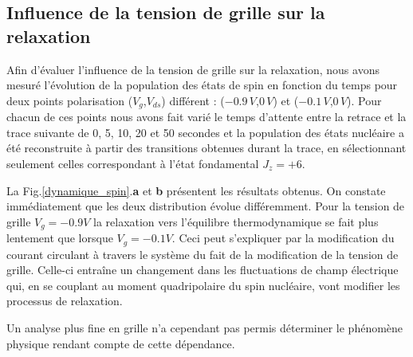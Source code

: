 \subsection{Influence de la tension de grille sur la relaxation}
Afin d'évaluer l'influence de la tension de grille sur la relaxation, nous avons mesuré l'évolution de la population des états de spin en fonction du temps pour deux points polarisation ($V_g$,$V_{ds}$) différent : ($-0.9\, V$,$0\, V$) et ($-0.1\, V$,$0\, V$). Pour chacun de ces points nous avons fait varié le temps d'attente entre la retrace et la trace suivante de 0, 5, 10, 20 et 50 secondes et la population des états nucléaire a été reconstruite à partir des transitions obtenues durant la trace, en sélectionnant seulement celles correspondant à l'état fondamental $J_z=+6$.

La Fig.\ref{dynamique_spin}.\textbf{a} et \textbf{b} présentent les résultats obtenus. On constate immédiatement que les deux distribution évolue différemment. Pour la tension de grille $V_g = -0.9V$ la relaxation vers l'équilibre thermodynamique se fait plus lentement que lorsque $V_g = -0.1V$.  Ceci peut s'expliquer par la modification du courant circulant à travers le système du fait de la modification de la tension de grille. Celle-ci entraîne un changement dans les fluctuations de champ électrique  qui, en se couplant au moment quadripolaire du spin nucléaire, vont modifier les processus de relaxation.

Un analyse plus fine en grille n'a cependant pas permis déterminer le phénomène physique rendant compte de cette dépendance.

